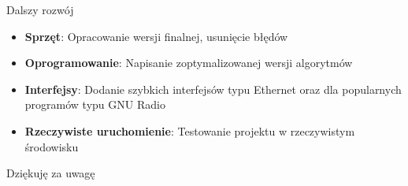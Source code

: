 \begin{frame}{Dalszy rozwój}
	\begin{itemize}
		\item \textbf{Sprzęt}: Opracowanie wersji finalnej, usunięcie błędów
		\item \textbf{Oprogramowanie}: Napisanie zoptymalizowanej wersji algorytmów
		\item \textbf{Interfejsy}: Dodanie szybkich interfejsów typu Ethernet oraz dla popularnych programów typu GNU Radio
		\item \textbf{Rzeczywiste uruchomienie}: Testowanie projektu w rzeczywistym środowisku
	\end{itemize} 
\end{frame}

\begin{frame}
	\begin{center}
		Dziękuję za uwagę
	\end{center}
\end{frame}

